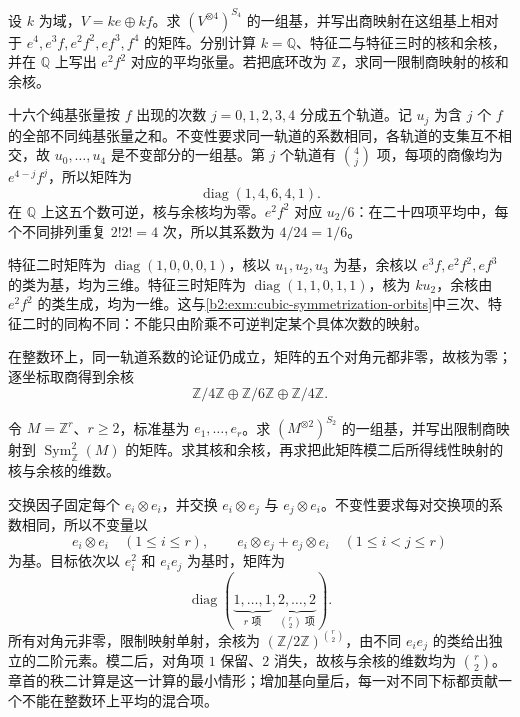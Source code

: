 \begin{exercise}\label{b2:ex:08-symmetrization-orbits}
	设 \(k\) 为域，\(V=ke\oplus kf\)。求 \((V^{\otimes4})^{S_4}\) 的一组基，并写出商映射在这组基上相对于 \(e^4,e^3f,e^2f^2,ef^3,f^4\) 的矩阵。分别计算 \(k=\mathbb Q\)、特征二与特征三时的核和余核，并在 \(\mathbb Q\) 上写出 \(e^2f^2\) 对应的平均张量。若把底环改为 \(\mathbb Z\)，求同一限制商映射的核和余核。
\end{exercise}
\begin{solution}
	十六个纯基张量按 \(f\) 出现的次数 \(j=0,1,2,3,4\) 分成五个轨道。记 \(u_j\) 为含 \(j\) 个 \(f\) 的全部不同纯基张量之和。不变性要求同一轨道的系数相同，各轨道的支集互不相交，故 \(u_0,\ldots,u_4\) 是不变部分的一组基。第 \(j\) 个轨道有 \(\binom4j\) 项，每项的商像均为 \(e^{4-j}f^j\)，所以矩阵为
	\[
		\operatorname{diag}(1,4,6,4,1).
	\]
	在 \(\mathbb Q\) 上这五个数可逆，核与余核均为零。\(e^2f^2\) 对应 \(u_2/6\)：在二十四项平均中，每个不同排列重复 \(2!2!=4\) 次，所以其系数为 \(4/24=1/6\)。

	特征二时矩阵为 \(\operatorname{diag}(1,0,0,0,1)\)，核以 \(u_1,u_2,u_3\) 为基，余核以 \(e^3f,e^2f^2,ef^3\) 的类为基，均为三维。特征三时矩阵为 \(\operatorname{diag}(1,1,0,1,1)\)，核为 \(ku_2\)，余核由 \(e^2f^2\) 的类生成，均为一维。这与\cref{b2:exm:cubic-symmetrization-orbits}中三次、特征二时的同构不同：不能只由阶乘不可逆判定某个具体次数的映射。

	在整数环上，同一轨道系数的论证仍成立，矩阵的五个对角元都非零，故核为零；逐坐标取商得到余核
	\[
		\mathbb Z/4\mathbb Z\oplus\mathbb Z/6\mathbb Z\oplus\mathbb Z/4\mathbb Z.
	\]
\end{solution}

\begin{exercise}\label{b2:ex:08-invariants-over-integers}
	令 \(M=\mathbb Z^r\)、\(r\ge2\)，标准基为 \(e_1,\ldots,e_r\)。求 \((M^{\otimes2})^{S_2}\) 的一组基，并写出限制商映射到 \(\operatorname{Sym}_{\mathbb Z}^2(M)\) 的矩阵。求其核和余核，再求把此矩阵模二后所得线性映射的核与余核的维数。
\end{exercise}
\begin{solution}
	交换因子固定每个 \(e_i\otimes e_i\)，并交换 \(e_i\otimes e_j\) 与 \(e_j\otimes e_i\)。不变性要求每对交换项的系数相同，所以不变量以
	\[
		e_i\otimes e_i\quad(1\le i\le r),\qquad e_i\otimes e_j+e_j\otimes e_i\quad(1\le i<j\le r)
	\]
	为基。目标依次以 \(e_i^2\) 和 \(e_ie_j\) 为基时，矩阵为
	\[
		\operatorname{diag}(\underbrace{1,\ldots,1}_{r\text{ 项}}, \underbrace{2,\ldots,2}_{\binom r2\text{ 项}}).
	\]
	所有对角元非零，限制映射单射，余核为 \((\mathbb Z/2\mathbb Z)^{\binom r2}\)，由不同 \(e_ie_j\) 的类给出独立的二阶元素。模二后，对角项 \(1\) 保留、\(2\) 消失，故核与余核的维数均为 \(\binom r2\)。章首的秩二计算是这一计算的最小情形；增加基向量后，每一对不同下标都贡献一个不能在整数环上平均的混合项。
\end{solution}

